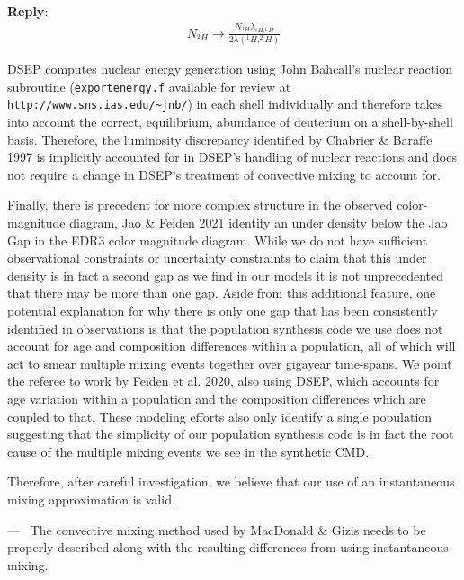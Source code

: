 \documentclass[11pt]{article}
\newcounter{reviewer}
\newcounter{point}[reviewer]
\renewcommand{\thepoint}{\arabic{point})}
\newenvironment{point}
   {\refstepcounter{point} \bigskip \noindent {\textbf{Referee~Point~\thepoint} } ---\ }
   {\par }
\newenvironment{reply}
   {\medskip \noindent \begin{sf}\textbf{Reply}:\  }
   {\medskip \end{sf}}
\begin{document}
\begin{reply}
	\begin{align}\label{eqn:2Habun}
		N_{^{2}H} \rightarrow \frac{N_{^{1}H}\lambda_{^{1}H,^{1}H}}{2\lambda(^{1}H,^{2}H)}
	\end{align}

	DSEP computes nuclear energy generation using John Bahcall's nuclear reaction
	subroutine (\texttt{exportenergy.f} available for review at
	\texttt{http://www.sns.ias.edu/\textasciitilde jnb/}) in each shell individually and
	therefore takes into account the correct, equilibrium, abundance of
	deuterium on a shell-by-shell basis. Therefore, the luminosity discrepancy
	identified by Chabrier \& Baraffe 1997 is implicitly accounted for in
	DSEP's handling of nuclear reactions and does not require a change in DSEP's
	treatment of convective mixing to account for.

	Finally, there is precedent for more complex structure in the observed
	color-magnitude diagram, Jao \& Feiden 2021 identify an under density below
	the Jao Gap in the EDR3 color magnitude diagram. While we do not have
	sufficient observational constraints or uncertainty constraints to claim
	that this under density is in fact a second gap as we find in our models it
	is not unprecedented that there may be more than one gap. Aside from this
	additional feature, one potential explanation for why there is only one gap
	that has been consistently identified in observations is that the
	population synthesis code we use does not account for age and composition
	differences within a population, all of which will act to smear multiple
	mixing events together over gigayear time-spans. We point the referee to work by
	Feiden et al. 2020, also using DSEP, which accounts for age variation within a
	population and the composition differences which are coupled to that. These
	modeling efforts also only identify a single population suggesting that the
	simplicity of our population synthesis code is in fact the root cause of
	the multiple mixing events we see in the synthetic CMD.

	Therefore, after careful investigation, we believe that our use of an
	instantaneous mixing approximation is valid.

\end{reply}

\begin{point}
	The convective mixing method used by MacDonald \& Gizis needs to be properly
	described along with the resulting differences from using instantaneous
	mixing.
	\label{pt:address}
\end{point}
\end{document}
